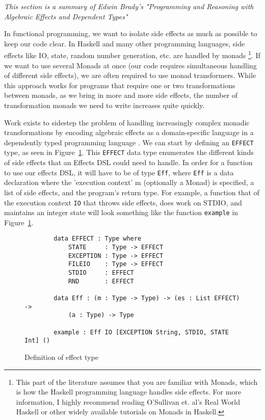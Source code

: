 \textit{This section is a summary of Edwin Brady's "Programming and Reasoning
with Algebraic Effects and Dependent Types" \cite{algebraic}}

In functional programming, we want to isolate side effects as much as possible
to keep our code clear. In Haskell and many other programming languages, side
effects like IO, state, random number generation, etc. are handled by monads
\cite{realworldhaskell}\footnote{This part of the literature assumes that you
are familiar with Monads, which is how the Haskell programming language handles
side effects. For more information, I highly recommend reading O'Sullivan et.
al's Real World Haskell or other widely available tutorials on Monads in
Haskell.}. If we want to use several Monads at once (our code requires
simultaneous handling of different side effects), we are often required to use
monad transformers. While this approach works for programs that require one or
two transformations between monads, as we bring in more and more side effects,
the number of transformation monads we need to write increases quite quickly. 

Work exists to sidestep the problem of handling increasingly complex monadic
transformations by encoding algebraic effects as a domain-specific language in a
dependently typed programming language \cite{algebraic}. We can start by
defining an \texttt{EFFECT} type, as seen in Figure~\ref{effects_def}. This
\texttt{EFFECT} data type enumerates the different kinds of side effects that an
Effects DSL could need to handle. In order for a function to use our effects
DSL, it will have to be of type \texttt{Eff}, where \texttt{Eff} is a data
declaration where the 'execution context' m (optionally a Monad) is specified, a
list of side effects, and the program's return type. For example, a function
that of the execution context \texttt{IO} that throws side effects, does work on
STDIO, and maintains an integer state will look something like the function
\texttt{example} in Figure~\ref{effects_def}. 

\begin{figure}[ht!!!!!!!!!!!]
    \caption{Definition of effect type}
    \label{effects_def}
    \begin{lstlisting}
        data EFFECT : Type where
            STATE     : Type -> EFFECT
            EXCEPTION : Type -> EFFECT
            FILEIO    : Type -> EFFECT
            STDIO     : EFFECT
            RND       : EFFECT
        
        data Eff : (m : Type -> Type) -> (es : List EFFECT) -> 
            (a : Type) -> Type
    
        example : Eff IO [EXCEPTION String, STDIO, STATE Int] ()
    \end{lstlisting}
\end{figure}


